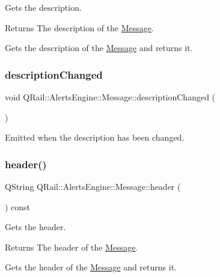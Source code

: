 Gets the description. 

\begin{DoxyReturn}{Returns}
The description of the \mbox{\hyperlink{classQRail_1_1AlertsEngine_1_1Message}{Message}}.
\end{DoxyReturn}
Gets the description of the \mbox{\hyperlink{classQRail_1_1AlertsEngine_1_1Message}{Message}} and returns it. \mbox{\label{classQRail_1_1AlertsEngine_1_1Message_a2558eb50cea5ae890fc68628e54ad9a0}} 
\subsubsection{\texorpdfstring{descriptionChanged}{descriptionChanged}}
{\footnotesize\ttfamily void Q\+Rail\+::\+Alerts\+Engine\+::\+Message\+::description\+Changed (\begin{DoxyParamCaption}{ }\end{DoxyParamCaption})\hspace{0.3cm}{\ttfamily [signal]}}



Emitted when the description has been changed. 

\mbox{\label{classQRail_1_1AlertsEngine_1_1Message_afa82f8ebbc074c3131254782a11c7414}} 
\subsubsection{\texorpdfstring{header()}{header()}}
{\footnotesize\ttfamily Q\+String Q\+Rail\+::\+Alerts\+Engine\+::\+Message\+::header (\begin{DoxyParamCaption}{ }\end{DoxyParamCaption}) const}



Gets the header. 

\begin{DoxyReturn}{Returns}
The header of the \mbox{\hyperlink{classQRail_1_1AlertsEngine_1_1Message}{Message}}.
\end{DoxyReturn}
Gets the header of the \mbox{\hyperlink{classQRail_1_1AlertsEngine_1_1Message}{Message}} and returns it. \mbox{\label{classQRail_1_1AlertsEngine_1_1Message_a682685d984964fe4f0bc6048fd11206d}} 
